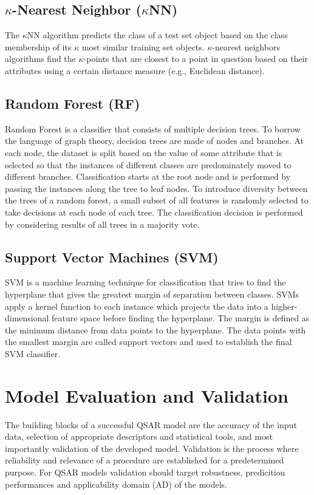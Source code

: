 \subsection{$\kappa$-Nearest Neighbor ($\kappa$NN)}
The $\kappa$NN algorithm predicts the class of a test set object based on the class membership of its $\kappa$ most similar training set objects. \cite{Lapins2013} $\kappa$-nearest neighbors algorithms find the $\kappa$-points that are closest to a point in question based on their attributes using a certain distance measure (e.g., Euclidean distance).

\subsection{Random Forest (RF)}
Random Forest is a classifier that consists of multiple decision trees. To borrow the language of graph theory, decision trees are made of nodes and branches. At each node, the dataset is split based on the value of some attribute that is selected so that the instances of different classes are predominately moved to different branches. Classification starts at the root node and is performed by passing the instances along the tree to leaf nodes. To introduce diversity between the trees of a random forest, a small subset of all features is randomly selected to take decisions at each node of each tree. The classification decision is performed by considering results of all trees in a majority vote. \cite{Lapins2013}

\subsection{Support Vector Machines (SVM)}
SVM is a machine learning technique for classification that tries to find the hyperplane that gives the greatest margin of separation between classes. SVMs apply a kernel function to each instance which projects the data into a higher-dimensional feature space before finding the hyperplane. \cite{Lapins2013} The margin is defined as the minimum distance from data points to the hyperplane. The data points with the smallest margin are called support vectors and used to establish the final SVM classifier.

\section{Model Evaluation and Validation}

The building blocks of a successful QSAR model are the accuracy of the input data, selection of appropriate descriptors and statistical tools, and most importantly validation of the developed model. Validation is the process where reliability and relevance of a procedure are established for a predetermined purpose. For QSAR models validation should target robustness, predicition performances and applicability domain (AD) of the models. \cite{Lapins2013}


